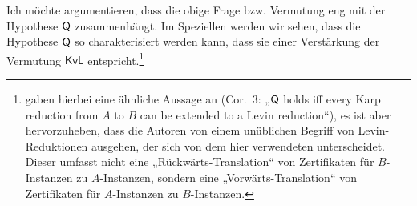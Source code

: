 \conjkvl*

Ich möchte argumentieren, dass die obige Frage bzw. Vermutung eng mit der Hypothese $\mathsf{Q}$ zusammenhängt.
Im Speziellen werden wir sehen, dass die Hypothese $\mathsf{Q}$ so charakterisiert werden kann, dass sie einer Verstärkung der Vermutung $\mathsf{KvL}$ entspricht.\footnote{\textcite{fenner_inverting_2003} gaben hierbei eine ähnliche Aussage an (Cor.~3: „$\mathsf{Q}$ holds iff every Karp reduction from $A$ to $B$ can be extended to a Levin reduction“), es ist aber hervorzuheben, dass die Autoren von einem unüblichen Begriff von Levin-Reduktionen ausgehen, der sich von dem hier verwendeten unterscheidet. Dieser umfasst nicht eine „Rückwärts-Translation“ von Zertifikaten für $B$-Instanzen zu $A$-Instanzen, sondern eine „Vorwärts-Translation“ von Zertifikaten für $A$-Instanzen zu $B$-Instanzen.}

